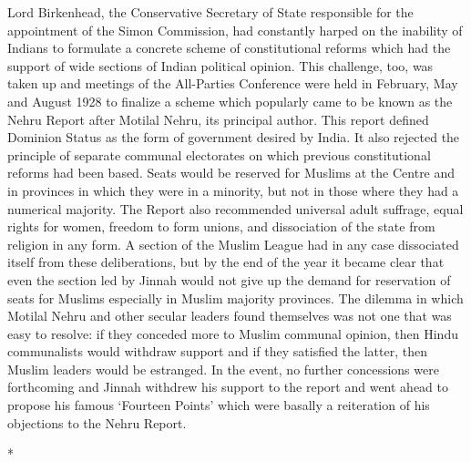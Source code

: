 \begin{multicols}{2}
Lord Birkenhead, the Conservative Secretary of State responsible for the appointment of the Simon Commission, had constantly harped on the inability of Indians to formulate a concrete scheme of constitutional reforms which had the support of wide sections of Indian political opinion. This challenge, too, was taken up and meetings of the All-Parties Conference were held in February, May and August 1928 to finalize a scheme which popularly came to be known as the Nehru Report after Motilal Nehru, its principal author. This report defined Dominion Status as the form of government desired by India. It also rejected the principle of separate communal electorates on which previous constitutional reforms had been based. Seats would be reserved for Muslims at the Centre and in provinces in which they were in a minority, but not in those where they had a numerical majority. The Report also recommended universal adult suffrage, equal rights for women, freedom to form unions, and dissociation of the state from religion in any form. A section of the Muslim League had in any case dissociated itself from these deliberations, but by the end of the year it became clear that even the section led by Jinnah would not give up the demand for reservation of seats for Muslims especially in Muslim majority provinces. The dilemma in which Motilal Nehru and other secular leaders found themselves was not one that was easy to resolve: if they conceded more to Muslim communal opinion, then Hindu communalists would withdraw support and if they satisfied the latter, then Muslim leaders would be estranged. In the event, no further concessions were forthcoming and Jinnah withdrew his support to the report and went ahead to propose his famous `Fourteen Points' which were basally a reiteration of his objections to the Nehru Report.

\begin{center}*\end{center}

\paragraph*{}


\end{multicols}
